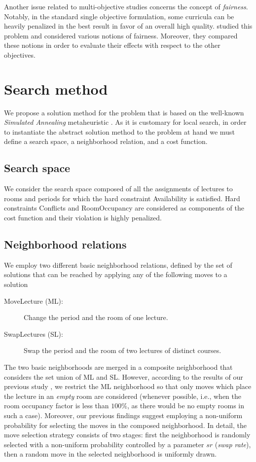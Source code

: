 \documentclass[authoryear,12pt]{article}
\begin{document}
Another issue related to multi-objective studies concerns the concept of
\emph{fairness}. Notably, in the standard single objective formulation, some
curricula can be heavily penalized in the best result in favor of an overall
high quality.  \citet{MuWa13} studied this problem and considered various
notions of fairness. Moreover, they compared these notions in order to evaluate
their effects with respect to the other objectives.

\section{Search method}
\label{sec:search}

We propose a solution method for the problem that is based on the well-known
\emph{Simulated Annealing} metaheuristic \citep{KiGV83}. As it is customary for
local search, in order to instantiate the abstract solution method to the
problem at hand we must define a search space, a neighborhood relation, and a
cost function.

\subsection{Search space} We consider the search space composed of all the
assignments of lectures to rooms and periods for which the hard constraint
\textsf{Availability} is satisfied.  Hard constraints \textsf{Conflicts} and
\textsf{RoomOccupancy} are considered as components of the cost function and
their violation is highly penalized.

\subsection{Neighborhood relations} We employ two different basic neighborhood
relations, defined by the set of solutions that can be reached by applying any
of the following moves to a solution

\begin{description}
\item[\textsf{MoveLecture (ML)}:] Change the period and the room of one lecture.
\item[\textsf{SwapLectures (SL)}:] Swap the period and the room of two lectures
  of distinct courses.
\end{description}

The two basic neighborhoods are merged in a composite neighborhood that
considers the set union of \textsf{ML} and \textsf{SL}. However, according to
the results of our previous study \citep{BeDS12}, we restrict the \textsf{ML}
neighborhood so that only moves which place the lecture in an \emph{empty} room
are considered (whenever possible, i.e., when the room occupancy factor is less
than $100\%$, as there would be no empty rooms in such a case).
%
Moreover, our previous findings suggest employing a non-uniform probability for
selecting the moves in the composed neighborhood.  In detail, the move selection
strategy consists of two stages: first the neighborhood is randomly selected
with a non-uniform probability controlled by a parameter $sr$ (\emph{swap
rate}), then a random move in the selected neighborhood is uniformly drawn.
\end{document}
